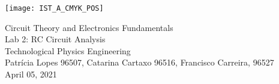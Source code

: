 
\thispagestyle {empty}


\begin{center}
    \texttt{[image: IST\_A\_CMYK\_POS]}
\end{center}


\begin{center}


{\FontLb \Huge Circuit Theory and Electronics Fundamentals} \\ %
\vspace{0.8cm}
{\FontSn \LARGE Lab 2: RC Circuit Analysis} \\
\vspace{0.5cm}
{\FontSn Technological Physics Engineering} \\ %
\vspace{0.5cm}
{\FontSn \normalsize Patrícia Lopes 96507, Catarina Cartaxo 96516, Francisco Carreira, 96527} \\
\vspace{0.3cm}
{\FontSn \small April 05, 2021} \\ %
\vspace{1cm}
\end{center}


